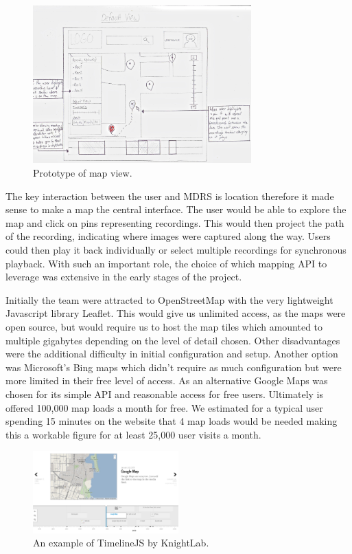 \documentclass{l3proj}
\begin{document}
\begin{figure}[ht!]
  \centering
\includegraphics[width=0.75\textwidth]{images/web-map-view.jpg}
\caption{Prototype of map view.}
\end{figure}

The key interaction between the user and MDRS is location therefore it made
sense to make a map the central interface. The user would be able to explore the
map and click on pins representing recordings. This would then project the path
of the recording, indicating where images were captured along the way. Users
could then play it back individually or select multiple recordings for
synchronous playback. With such an important role, the choice of which mapping
API to leverage was extensive in the early stages of the project.

Initially the team were attracted to OpenStreetMap with the very lightweight
Javascript library Leaflet. This would give us unlimited access, as the maps
were open source, but would require us to host the map tiles which amounted to
multiple gigabytes depending on the level of detail chosen. Other disadvantages
were the additional difficulty in initial configuration and setup. Another
option was Microsoft’s Bing maps which didn’t require as much configuration but
were more limited in their free level of access. As an alternative Google Maps
was chosen for its simple API and reasonable access for free users. Ultimately
is offered 100,000 map loads a month for free. We estimated for a typical user
spending 15 minutes on the website that 4 map loads would be needed making this
a workable figure for at least 25,000 user visits a month.

\begin{figure}[ht!]
  \centering
\includegraphics[width=0.5\textwidth]{images/timeline-example.png}
\caption{An example of TimelineJS by KnightLab.}
\end{figure}
\end{document}
